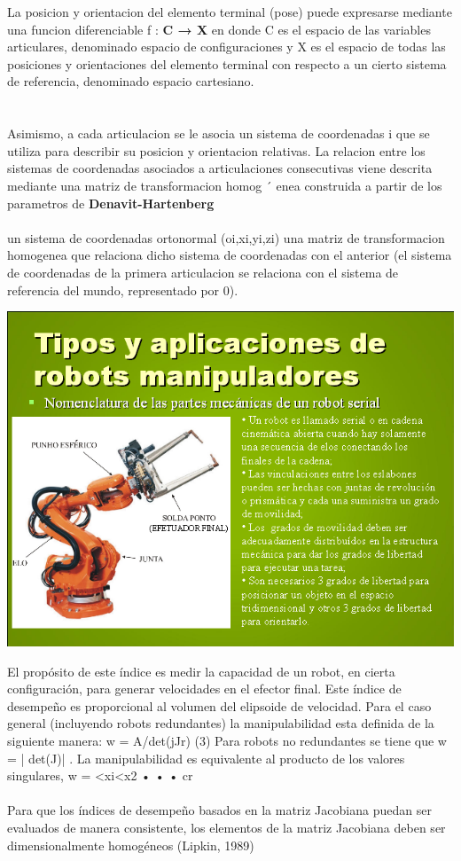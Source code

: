\documentclass[10pt,a4paper]{article}
\begin{document}
\begin{Large}
La posicion y orientacion del elemento terminal (pose) puede expresarse mediante una funcion diferenciable f : \textbf{C → X}
en donde C es el espacio de las variables articulares, denominado espacio de configuraciones y X es el espacio de todas las
posiciones y orientaciones del elemento terminal con respecto a un cierto sistema de referencia, denominado espacio cartesiano. \\ \\ \\
 Asimismo, a cada articulacion  se le asocia un sistema de coordenadas {i} que se utiliza para describir su posicion y orientacion relativas. La relacion entre los sistemas de coordenadas asociados a articulaciones consecutivas viene descrita
mediante una matriz de transformacion homog ´ enea construida a partir de los parametros de \textbf{Denavit-Hartenberg} \\ \\ 
un sistema de coordenadas ortonormal (oi,xi,yi,zi) una matriz de transformacion homogenea que relaciona dicho sistema de coordenadas con el anterior (el sistema de coordenadas de la
primera articulacion se relaciona con el sistema de referencia del mundo, representado por {0}).
\end{Large}
\begin{center}
\includegraphics[scale=0.7]{imagenes/brazo.png} 
\end{center}
\begin{Large}
El propósito de este índice es medir la capacidad de un
robot, en cierta configuración, para generar velocidades en el
efector final. Este índice de desempeño es proporcional al volumen del elipsoide de velocidad.  Para el caso general (incluyendo robots redundantes) la manipulabilidad esta definida de la
siguiente manera:
w = A/det(jJr) (3)
Para robots no redundantes se tiene que w = | det(J)| . La
manipulabilidad es equivalente al producto de los valores singulares, w = <xi<x2 • • • cr \\ \\
Para que los índices de desempeño basados en la matriz Jacobiana puedan ser evaluados de manera consistente, los elementos de la matriz Jacobiana deben ser dimensionalmente homogéneos (Lipkin, 1989)
\end{Large}
\end{document}
